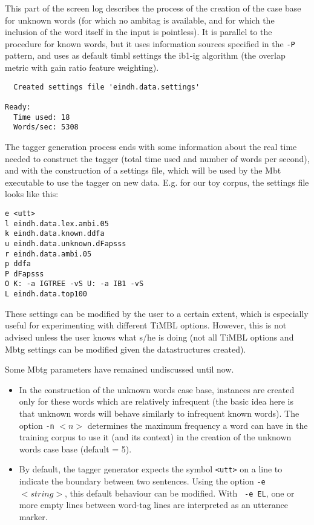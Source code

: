 \documentclass{report}
\begin{document}
This part of the screen log describes the process of the creation of
the case base for unknown words (for which no ambitag is available,
and for which the inclusion of the word itself in the input is
pointless). It is parallel to the procedure for known words, but it
uses information sources specified in the {\tt -P} pattern, and uses
as default {\sc timbl} settings the {\sc ib1-ig} algorithm (the
overlap metric with gain ratio feature weighting).

{\small
\begin{verbatim}
  Created settings file 'eindh.data.settings'

Ready:
  Time used: 18
  Words/sec: 5308
\end{verbatim}
}

The tagger generation process ends with some information about the
real time needed to construct the tagger (total time used and number
of words per second), and with the construction of a settings file,
which will be used by the Mbt executable to use the tagger on
new data. E.g. for our toy corpus, the settings file looks like this:

{\small
\begin{verbatim}
e <utt>
l eindh.data.lex.ambi.05
k eindh.data.known.ddfa
u eindh.data.unknown.dFapsss
r eindh.data.ambi.05
p ddfa
P dFapsss
O K: -a IGTREE -vS U: -a IB1 -vS 
L eindh.data.top100
\end{verbatim}
}

These settings can be modified by the user to a certain extent, which
is especially useful for experimenting with different TiMBL
options. However, this is not advised unless the user knows what s/he
is doing (not all TiMBL options and Mbtg settings can be
modified given the datastructures created).

Some Mbtg parameters have remained undiscussed until now. 

\begin{itemize}
\item 
In the construction of the unknown words case base, instances are
created only for these words which are relatively infrequent (the
basic idea here is that unknown words will behave similarly to
infrequent known words).  The option {\tt -n} $<n>$ determines the maximum
frequency a word can have in the training corpus to use it (and its
context) in the creation of the unknown words case base (default = 5).
\item
By default, the tagger generator expects the symbol {\tt <utt>} on a
line to indicate the boundary between two sentences.  Using the option
{\tt -e} $<string>$, this default behaviour can be modified. With {\tt
-e EL}, one or more empty lines between word-tag lines are
interpreted as an utterance marker.
\end{itemize}
\end{document}
